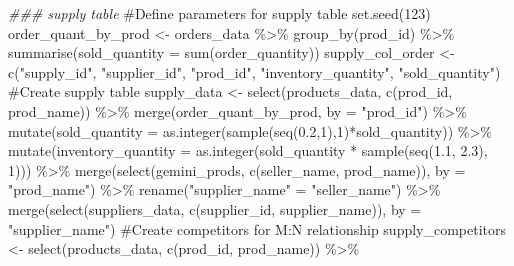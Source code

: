 \documentclass[
  letterpaper,
  DIV=11,
  numbers=noendperiod]{scrartcl}
\newenvironment{Shaded}{\begin{snugshade}}{\end{snugshade}}
\newcommand{\AttributeTok}[1]{\textcolor[rgb]{0.40,0.45,0.13}{#1}}
\newcommand{\CommentTok}[1]{\textcolor[rgb]{0.37,0.37,0.37}{#1}}
\newcommand{\DecValTok}[1]{\textcolor[rgb]{0.68,0.00,0.00}{#1}}
\newcommand{\DocumentationTok}[1]{\textcolor[rgb]{0.37,0.37,0.37}{\textit{#1}}}
\newcommand{\FloatTok}[1]{\textcolor[rgb]{0.68,0.00,0.00}{#1}}
\newcommand{\FunctionTok}[1]{\textcolor[rgb]{0.28,0.35,0.67}{#1}}
\newcommand{\NormalTok}[1]{\textcolor[rgb]{0.00,0.23,0.31}{#1}}
\newcommand{\OtherTok}[1]{\textcolor[rgb]{0.00,0.23,0.31}{#1}}
\newcommand{\SpecialCharTok}[1]{\textcolor[rgb]{0.37,0.37,0.37}{#1}}
\newcommand{\StringTok}[1]{\textcolor[rgb]{0.13,0.47,0.30}{#1}}
\begin{document}
\begin{Shaded}
\begin{Highlighting}[numbers=left,,]
\DocumentationTok{\#\#\# \textquotesingle{}supply\textquotesingle{} table}
\CommentTok{\#Define parameters for supply table}
\FunctionTok{set.seed}\NormalTok{(}\DecValTok{123}\NormalTok{)}
\NormalTok{order\_quant\_by\_prod }\OtherTok{\textless{}{-}}\NormalTok{ orders\_data }\SpecialCharTok{\%\textgreater{}\%}
  \FunctionTok{group\_by}\NormalTok{(prod\_id) }\SpecialCharTok{\%\textgreater{}\%} \FunctionTok{summarise}\NormalTok{(}\AttributeTok{sold\_quantity =} \FunctionTok{sum}\NormalTok{(order\_quantity))}
\NormalTok{supply\_col\_order }\OtherTok{\textless{}{-}} \FunctionTok{c}\NormalTok{(}\StringTok{"supply\_id"}\NormalTok{, }\StringTok{"supplier\_id"}\NormalTok{, }\StringTok{"prod\_id"}\NormalTok{, }
                      \StringTok{"inventory\_quantity"}\NormalTok{, }\StringTok{"sold\_quantity"}\NormalTok{)}
\CommentTok{\#Create supply table}
\NormalTok{supply\_data }\OtherTok{\textless{}{-}} \FunctionTok{select}\NormalTok{(products\_data, }\FunctionTok{c}\NormalTok{(prod\_id, prod\_name)) }\SpecialCharTok{\%\textgreater{}\%}
  \FunctionTok{merge}\NormalTok{(order\_quant\_by\_prod, }\AttributeTok{by =} \StringTok{"prod\_id"}\NormalTok{) }\SpecialCharTok{\%\textgreater{}\%}
  \FunctionTok{mutate}\NormalTok{(}\AttributeTok{sold\_quantity =} \FunctionTok{as.integer}\NormalTok{(}\FunctionTok{sample}\NormalTok{(}\FunctionTok{seq}\NormalTok{(}\FloatTok{0.2}\NormalTok{,}\DecValTok{1}\NormalTok{),}\DecValTok{1}\NormalTok{)}\SpecialCharTok{*}\NormalTok{sold\_quantity)) }\SpecialCharTok{\%\textgreater{}\%}
  \FunctionTok{mutate}\NormalTok{(}\AttributeTok{inventory\_quantity =} 
           \FunctionTok{as.integer}\NormalTok{(sold\_quantity }\SpecialCharTok{*} \FunctionTok{sample}\NormalTok{(}\FunctionTok{seq}\NormalTok{(}\FloatTok{1.1}\NormalTok{, }\FloatTok{2.3}\NormalTok{), }\DecValTok{1}\NormalTok{))) }\SpecialCharTok{\%\textgreater{}\%}
  \FunctionTok{merge}\NormalTok{(}\FunctionTok{select}\NormalTok{(gemini\_prods, }\FunctionTok{c}\NormalTok{(seller\_name, prod\_name)), }\AttributeTok{by =} \StringTok{"prod\_name"}\NormalTok{) }\SpecialCharTok{\%\textgreater{}\%}
  \FunctionTok{rename}\NormalTok{(}\StringTok{"supplier\_name"} \OtherTok{=} \StringTok{"seller\_name"}\NormalTok{) }\SpecialCharTok{\%\textgreater{}\%}
  \FunctionTok{merge}\NormalTok{(}\FunctionTok{select}\NormalTok{(suppliers\_data, }\FunctionTok{c}\NormalTok{(supplier\_id, supplier\_name)), }
        \AttributeTok{by =} \StringTok{"supplier\_name"}\NormalTok{)}
\CommentTok{\#Create competitors for M:N relationship}
\NormalTok{supply\_competitors }\OtherTok{\textless{}{-}} \FunctionTok{select}\NormalTok{(products\_data, }\FunctionTok{c}\NormalTok{(prod\_id, prod\_name)) }\SpecialCharTok{\%\textgreater{}\%}

\end{Highlighting}
\end{Shaded}
\end{document}
